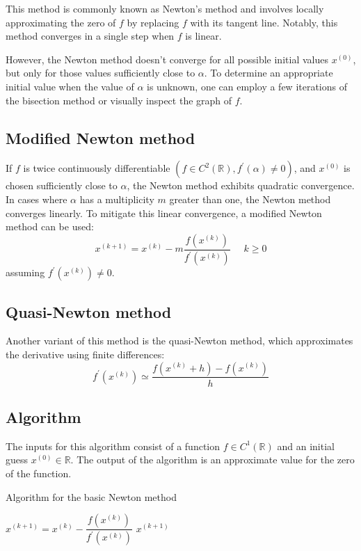 \documentclass[12pt, a4paper]{report}
\begin{document}
    This method is commonly known as Newton's method and involves locally approximating the zero of $f$ by replacing $f$ with its tangent line.
    Notably, this method converges in a single step when $f$ is linear.

    However, the Newton method doesn't converge for all possible initial values $x^{(0)}$, but only for those values sufficiently close to $\alpha$. 
    To determine an appropriate initial value when the value of $\alpha$ is unknown, one can employ a few iterations of the bisection method or visually inspect the graph of $f$. 

    \subsection{Modified Newton method}
    If $f$ is twice continuously differentiable $\left(f \in C^2(\mathbb{R}),f^{'}(\alpha) \neq 0\right)$, and $x^{(0)}$ is chosen sufficiently close to $\alpha$, the Newton method exhibits quadratic convergence.
    In cases where $\alpha$  has a multiplicity $m$ greater than one, the Newton method converges linearly. 
    To mitigate this linear convergence, a modified Newton method can be used:
    \[x^{(k+1)}=x^{(k)}-m\dfrac{f(x^{(k)})}{f^{'}(x^{(k)})} \:\:\:\:\:\: k \geq 0\]
    assuming $f^{'}(x^{(k)}) \neq 0$.

    \subsection{Quasi-Newton method}
    Another variant of this method is the quasi-Newton method, which approximates the derivative using finite differences:
    \[f^{'}(x^{(k)}) \simeq \dfrac{f(x^{(k)}+h)-f(x^{(k)})}{h}\]

    \subsection{Algorithm}
    The inputs for this algorithm consist of a function $f \in C^1(\mathbb{R})$ and an initial guess $x^{(0)} \in \mathbb{R}$. 
    The output of the algorithm is an approximate value for the zero of the function.
    \begin{algorithm}[H]
        \caption{Algorithm for the basic Newton method}
            \begin{algorithmic}[1]
                    \State $x^{(k+1)}=x^{(k)}-\dfrac{f(x^{(k)})}{f^{'}(x^{(k)})}$
                        \State \Return $x^{(k+1)}$
                    \EndIf
                \EndFor
            \end{algorithmic}
    \end{algorithm}
\end{document}
